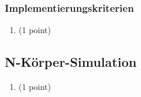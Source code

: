 \documentclass[a4paper]{scrartcl}
\begin{document}
\subsubsection*{Implementierungskriterien}
	\begin{enumerate}
		\item (1 point)
	\end{enumerate}

\subsection{N-Körper-Simulation}
	\begin{enumerate}
		\item (1 point)
	\end{enumerate}


		
\end{document}
